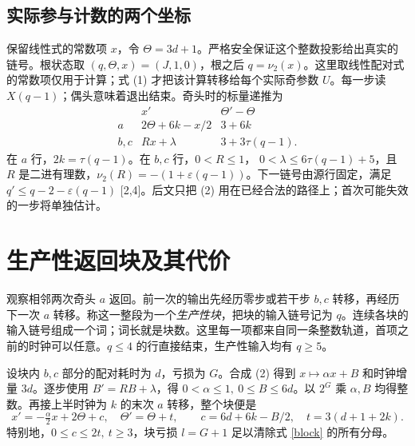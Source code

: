 \documentclass[UTF8,12pt,a4paper,fontset=fandol,scheme=plain]{ctexart}
\theoremstyle{cn}\newtheorem{thm}{定理}\newtheorem{lem}[thm]{引理}
\newcommand{\vv}{\nu_2}\newcommand{\lgx}{\log_2}
\begin{document}
\subsection{实际参与计数的两个坐标}
保留线性式的常数项 \(x\)，令 \(\Theta=3d+1\)。严格安全保证这个整数投影给出真实的链号。根状态取 \((q,\Theta,x)=(J,1,0)\)，根之后 \(q=\vv(x)\)。这里取线性配对式的常数项仅用于计算；式 (1) 才把该计算转移给每个实际奇参数 \(U\)。每一步读 \(X(q-1)\)；偶头意味着退出结束。奇头时的标量递推为
\begin{equation}
\begin{array}{c|cc}
 & x' & \Theta'-\Theta\\ \hline
a & 2\Theta+6k-x/2 & 3+6k\\
b,c & R x+\lambda & 3+3\tau(q-1).
\end{array}                                                       \label{rules}
\end{equation}
在 \(a\) 行，\(2k=\tau(q-1)\)。在 \(b,c\) 行，\(0<R\le1\)，
\(0<\lambda\le6\tau(q-1)+5\)，且 \(R\) 是二进有理数，\(\vv(R)=-(1+\varepsilon(q-1))\)。下一链号由源行固定，满足 \(q'\le q-2-\varepsilon(q-1)\) [2,4]。后文只把 (2) 用在已经合法的路径上；首次可能失效的一步将单独估计。

\newpage
\section{生产性返回块及其代价}
观察相邻两次奇头 \(a\) 返回。前一次的输出先经历零步或若干步 \(b,c\) 转移，再经历下一次 \(a\) 转移。称这一整段为一个\emph{生产性块}，把块的输入链号记为 \(q\)。连续各块的输入链号组成一个词；词长就是块数。这里每一项都来自同一条整数轨道，首项之前的时钟可以任意。\(q\le4\) 的行直接结束，生产性输入均有 \(q\ge5\)。

设块内 \(b,c\) 部分的配对耗时为 \(d\)，亏损为 \(G\)。合成 (2) 得到 \(x\mapsto\alpha x+B\) 和时钟增量 \(3d\)。逐步使用 \(B'=RB+\lambda\)，得 \(0<\alpha\le1,\ 0\le B\le6d\)。以 \(2^G\) 乘 \(\alpha,B\) 均得整数。再接上半时钟为 \(k\) 的末次 \(a\) 转移，整个块便是
\begin{equation}
 x'=-\tfrac{\alpha}{2}x+2\Theta+c,\quad \Theta'=\Theta+t,\qquad
 c=6d+6k-B/2,\quad t=3(d+1+2k).                                  \label{block}
\end{equation}
特别地，\(0\le c\le2t,\ t\ge3\)，块亏损 \(l=G+1\) 足以清除式 \eqref{block} 的所有分母。
\end{document}
